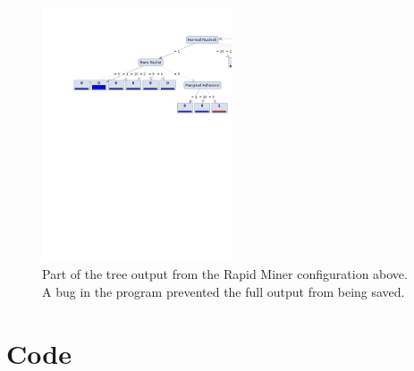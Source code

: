 \begin{figure}[H]
  \centering
    \includegraphics[width=0.5\textwidth]{images/RM_tree.png}
  \caption{\scriptsize Part of the tree output from the Rapid Miner configuration above.  A bug in the program prevented the full output from being saved.}
\end{figure}


\section*{Code}










